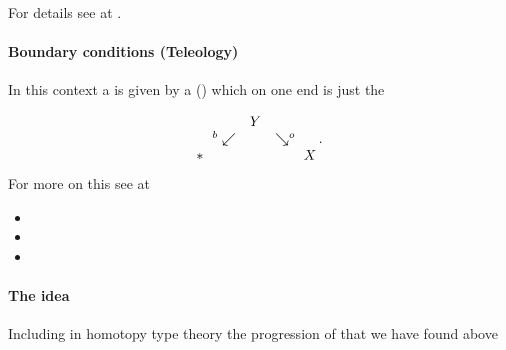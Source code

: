 \documentclass[12pt,titlepage]{article}
\def\mathllap{\mathpalette\mathllapinternal}
\def\mathrlap{\mathpalette\mathrlapinternal}
\def\mathllapinternal#1#2{\llap{$\mathsurround=0pt#1{#2}$}}
\def\mathrlapinternal#1#2{\rlap{$\mathsurround=0pt#1{#2}$}}
\newcommand{\itexarray}[1]{\begin{matrix}#1\end{matrix}}
\theoremstyle{plain}
\theoremstyle{definition}
\theoremstyle{remark}
\begin{document}
For details see at .

\hypertarget{boundary_conditions_teleology}{}\paragraph*{{Boundary conditions (Teleology)}}\label{boundary_conditions_teleology}

In this context a  is given by a ()  which on one end is just the 

\begin{displaymath}
\itexarray{
    && Y
    \\
    & {}^{\mathllap{b}}\swarrow && \searrow^{\mathrlap{o}}
    \\
    \ast && && X
  }
  \,.
\end{displaymath}
For more on this see at

\begin{itemize}%
\item {}


\item {}


\item {}



\end{itemize}
\hypertarget{TheIdea}{}\paragraph*{{The idea}}\label{TheIdea}

Including in homotopy type theory the progression of  that we have found above
\end{document}
